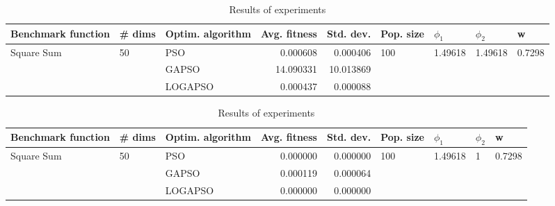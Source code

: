 \documentclass{article}
\begin{document}
\begin{table}
\centering
\caption{Results of experiments}
\begin{tabular}{lllrrllll}
\toprule
         Benchmark function &             \# dims & Optim. algorithm &  Avg. fitness &  Std. dev. &            Pop. size &               $\phi_{1}$ &               $\phi_{2}$ &                       w \\
\midrule
\multirow{3}{*}{Square Sum} & \multirow{3}{*}{50} &              PSO &      0.000608 &   0.000406 & \multirow{3}{*}{100} & \multirow{3}{*}{1.49618} & \multirow{3}{*}{1.49618} & \multirow{3}{*}{0.7298} \\
                            &                     &            GAPSO &     14.090331 &  10.013869 &                      &                          &                          &                         \\
                            &                     &          LOGAPSO &      0.000437 &   0.000088 &                      &                          &                          &                         \\
\bottomrule
\end{tabular}
\end{table}
\begin{table}
\centering
\caption{Results of experiments}
\begin{tabular}{lllrrllll}
\toprule
         Benchmark function &             \# dims & Optim. algorithm &  Avg. fitness &  Std. dev. &            Pop. size &               $\phi_{1}$ &         $\phi_{2}$ &                       w \\
\midrule
\multirow{3}{*}{Square Sum} & \multirow{3}{*}{50} &              PSO &      0.000000 &   0.000000 & \multirow{3}{*}{100} & \multirow{3}{*}{1.49618} & \multirow{3}{*}{1} & \multirow{3}{*}{0.7298} \\
                            &                     &            GAPSO &      0.000119 &   0.000064 &                      &                          &                    &                         \\
                            &                     &          LOGAPSO &      0.000000 &   0.000000 &                      &                          &                    &                         \\
\bottomrule
\end{tabular}
\end{table}
\end{document}
